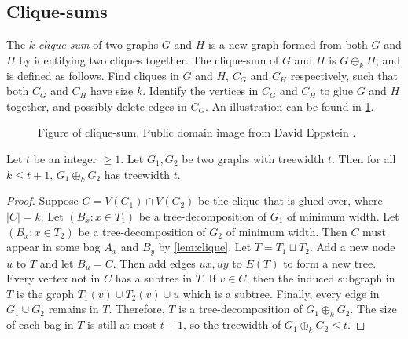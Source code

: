 \subsection{Clique-sums}\label{sssec:Clique_Sums}
The \textit{\(k\)-clique-sum} of two graphs \(G\) and \(H\) is a new graph formed from both $G$ and $H$ by identifying two cliques together. The clique-sum of $G$ and $H$ is \(G \oplus_k H\), and is defined as follows. Find cliques in \(G\) and \(H\), \(C_G\) and \(C_H\) respectively, such that both \(C_G\) and \(C_H\) have size \(k\). Identify the vertices in \(C_G\) and \(C_H\) to glue \(G\) and \(H\) together, and possibly delete edges in $C_G$. An illustration can be found in \cref{fig:clique-sum}. 

\begin{figure}[h]
	\centering
	
	\caption{Figure of clique-sum. Public domain image from David Eppstein \cite{eppsteinCliquesum2023}.}
	\label{fig:clique-sum}
\end{figure}


\begin{lemma}
	Let $t$ be an integer $\geq 1$. Let $G_1, G_2$ be two graphs with treewidth $t$. Then for all $k \leq t + 1$, $G_1 \oplus_k G_2$ has treewidth $t$. 
\end{lemma}
\begin{proof}
	Suppose $C = V(G_1) \cap V(G_2)$ be the clique that is glued over, where $|C| = k$. Let $(B_x: x \in T_1)$ be a tree-decomposition of $G_1$ of minimum width. Let $(B_x : x \in T_2)$ be a tree-decomposition of $G_2$ of minimum width. Then $C$ must appear in some bag $A_x$ and $B_y$ by \cref{lem:clique}. Let $T = T_1 \sqcup T_2$. Add a new node $u$ to $T$ and let $B_u = C$. Then add edges $ux, uy$ to $E(T)$ to form a new tree. Every vertex not in $C$ has a subtree in $T$. If $v \in C$, then the induced subgraph in $T$ is the graph $T_1(v) \cup T_2(v) \cup u$ which is a subtree. Finally, every edge in $G_1 \cup G_2$ remains in $T$. Therefore, $T$ is a tree-decomposition of $G_1 \oplus_k G_2$. The size of each bag in $T$ is still at most $t + 1$, so the treewidth of $G_1 \oplus_k G_2 \leq t$.
\end{proof}

